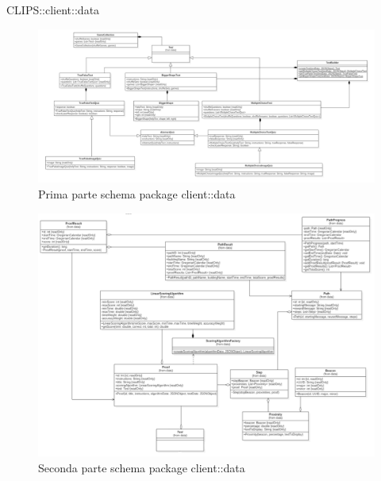 \begin{componente}{CLIPS::client::data}
\begin{figure}[h!]
	\centering
	\includegraphics[scale=0.3]{img/package/png/client--data1.png}
	\caption{Prima parte schema package client::data}
\end{figure}
\begin{figure}[h!]
	\centering
 \includegraphics[scale=0.3]{img/package/png/client--data2.png}
 \caption{Seconda parte schema package client::data}
\end{figure}
\begin{figure}[h!]
 \centering

\end{figure}
\end{componente}
